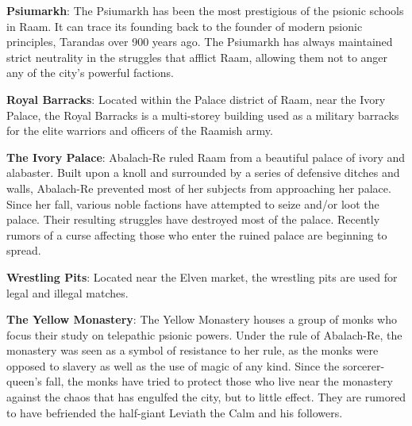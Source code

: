 {	\textbf{Psiumarkh}: The Psiumarkh has been the most prestigious of the psionic schools in Raam. It can trace its founding back to the founder of modern psionic principles, Tarandas over 900 years ago. The Psiumarkh has always maintained strict neutrality in the struggles that afflict Raam, allowing them not to anger any of the city's powerful factions.

	\textbf{Royal Barracks}: Located within the Palace district of Raam, near the Ivory Palace, the Royal Barracks is a multi-storey building used as a military barracks for the elite warriors and officers of the Raamish army.

	\textbf{The Ivory Palace}: Abalach-Re ruled Raam from a beautiful palace of ivory and alabaster. Built upon a knoll and surrounded by a series of defensive ditches and walls, Abalach-Re prevented most of her subjects from approaching her palace. Since her fall, various noble factions have attempted to seize and/or loot the palace. Their resulting struggles have destroyed most of the palace. Recently rumors of a curse affecting those who enter the ruined palace are beginning to spread.

	\textbf{Wrestling Pits}: Located near the Elven market, the wrestling pits are used for legal and illegal matches.

	\textbf{The Yellow Monastery}: The Yellow Monastery houses a group of monks who focus their study on telepathic psionic powers. Under the rule of Abalach-Re, the monastery was seen as a symbol of resistance to her rule, as the monks were opposed to slavery as well as the use of magic of any kind. Since the sorcerer-queen's fall, the monks have tried to protect those who live near the monastery against the chaos that has engulfed the city, but to little effect. They are rumored to have befriended the half-giant Leviath the Calm and his followers.
}
